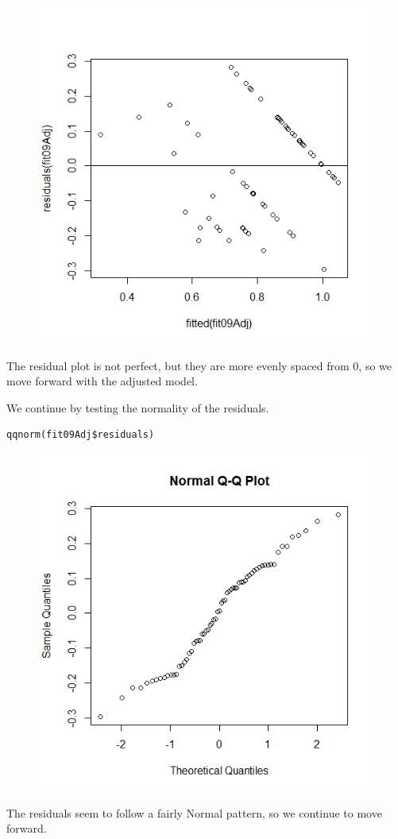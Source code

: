 \documentclass[]{scrartcl}
\begin{document}
\normalsize
\begin{figure}[H]
	\centering
	\includegraphics[scale=.6]{2009Aresid.png}
\end{figure}
The residual plot is not perfect, but they are more evenly spaced from 0, so we move forward with the adjusted model.

We continue by testing the normality of the residuals.
\footnotesize
\begin{verbatim}
qqnorm(fit09Adj$residuals)
\end{verbatim}
\normalsize
\begin{figure}[H]
	\centering
	\includegraphics[scale=.6]{2009Anorm.png}
\end{figure}
The residuals seem to follow a fairly Normal pattern, so we continue to move forward.
\end{document}
